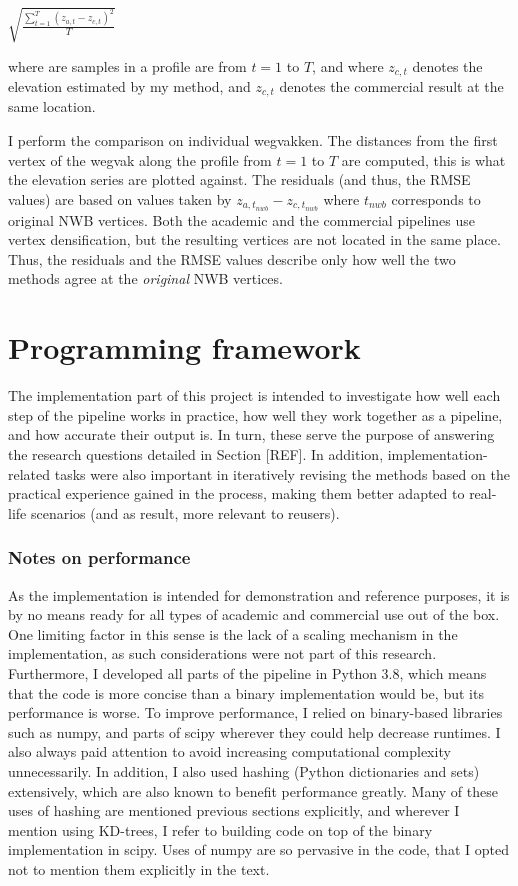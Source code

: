 $\sqrt{\frac{\sum_{t=1}^{T}\left(z_{a,t} - z_{c,t}\right)^2}{T}}$

where are samples in a profile are from $t=1$ to $T$, and where $z_{c,t}$ denotes the elevation estimated by my method, and $z_{c,t}$ denotes the commercial result at the same location.

I perform the comparison on individual wegvakken. The distances from the first vertex of the wegvak along the profile from $t=1$ to $T$ are computed, this is what the elevation series are plotted against. The residuals (and thus, the RMSE values) are based on values taken by $z_{a,t_{nwb}} - z_{c,t_{nwb}}$ where $t_{nwb}$ corresponds to original NWB vertices. Both the academic and the commercial pipelines use vertex densification, but the resulting vertices are not located in the same place. Thus, the residuals and the RMSE values describe only how well the two methods agree at the \textit{original} NWB vertices.

\section{Programming framework}
\label{sec:programming}

The implementation part of this project is intended to investigate how well each step of the pipeline works in practice, how well they work together as a pipeline, and how accurate their output is. In turn, these serve the purpose of answering the research questions detailed in Section [REF]. In addition, implementation-related tasks were also important in iteratively revising the methods based on the practical experience gained in the process, making them better adapted to real-life scenarios (and as result, more relevant to reusers).

\subsubsection{Notes on performance}

As the implementation is intended for demonstration and reference purposes, it is by no means ready for all types of academic and commercial use out of the box. One limiting factor in this sense is the lack of a scaling mechanism in the implementation, as such considerations were not part of this research. Furthermore, I developed all parts of the pipeline in Python 3.8, which means that the code is more concise than a binary implementation would be, but its performance is worse. To improve performance, I relied on binary-based libraries such as numpy, and parts of scipy wherever they could help decrease runtimes. I also always paid attention to avoid increasing computational complexity unnecessarily. In addition, I also used hashing (Python dictionaries and sets) extensively, which are also known to benefit performance greatly. Many of these uses of hashing are mentioned previous sections explicitly, and wherever I mention using KD-trees, I refer to building code on top of the binary implementation in scipy. Uses of numpy are so pervasive in the code, that I opted not to mention them explicitly in the text.

